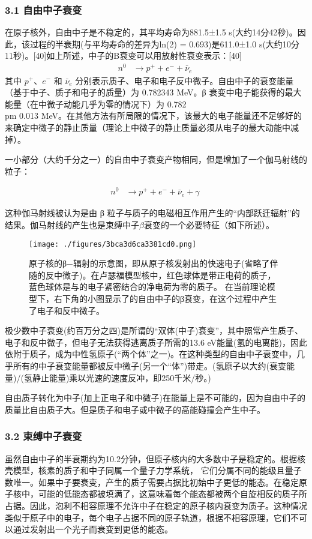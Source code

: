 \subsubsection{3.1 自由中子衰变}
在原子核外，自由中子是不稳定的，其平均寿命为881.5±1.5 s(大约14分42秒)。因此，该过程的半衰期(与平均寿命的差异为ln(2) = 0.693)是611.0±1.0 s(大约10分11秒)。[40]如上所述，中子的Β衰变可以用放射性衰变表示：[40]
\begin{align}
n^0 &\rightarrow p^+ + e^- + \bar{\nu}_e~
\end{align}
其中 $p^+$、$e^-$ 和 $\bar{\nu}_e$ 分别表示质子、电子和电子反中微子。自由中子的衰变能量（基于中子、质子和电子的质量）为 0.782343 MeV。β 衰变中电子能获得的最大能量（在中微子动能几乎为零的情况下）为 0.782 \\pm 0.013 MeV。在其他方法有所局限的情况下，该最大的电子能量还不足够好的来确定中微子的静止质量（理论上中微子的静止质量必须从电子的最大动能中减掉）。

一小部分（大约千分之一）的自由中子衰变产物相同，但是增加了一个伽马射线的粒子：

\begin{align}
n^0 &\rightarrow p^+ + e^- + \bar{\nu}_e + \gamma~
\end{align}

这种伽马射线被认为是由 β 粒子与质子的电磁相互作用产生的“内部跃迁辐射”的结果。伽马射线的产生也是束缚中子$\beta$衰变的一个必要特征（如下所述）。
\begin{figure}[ht]
\centering
\texttt{[image: ./figures/3bca3d6ca3381cd0.png]}
\caption{原子核的β−辐射的示意图，即从原子核发射出的快速电子(省略了伴随的反中微子)。在卢瑟福模型核中，红色球体是带正电荷的质子，蓝色球体是与的电子紧密结合的净电荷为零的质子。 在当前理论模型下，右下角的小图显示了的自由中子的β衰变，在这个过程中产生了电子和反中微子。} \label{fig_Neutro_4}
\end{figure}
极少数中子衰变(约百万分之四)是所谓的“双体(中子)衰变”，其中照常产生质子、电子和反中微子，但电子无法获得逃离质子所需的13.6 eV能量(氢的电离能)，因此依附于质子，成为中性氢原子(“两个体”之一)。在这种类型的自由中子衰变中，几乎所有的中子衰变能量都被反中微子(另一个“体”)带走。(氢原子以大约(衰变能量)/(氢静止能量)乘以光速的速度反冲，即250千米/秒。)

自由质子转化为中子(加上正电子和中微子)在能量上是不可能的，因为自由中子的质量比自由质子大。但是质子和电子或中微子的高能碰撞会产生中子。

\subsubsection{3.2 束缚中子衰变}
虽然自由中子的半衰期约为10.2分钟，但原子核内的大多数中子是稳定的。根据核壳模型，核素的质子和中子同属一个量子力学系统， 它们分属不同的能级且量子数唯一。如果中子要衰变，产生的质子需要占据比初始中子更低的能态。在稳定原子核中，可能的低能态都被填满了，这意味着每个能态都被两个自旋相反的质子所占据。因此，泡利不相容原理不允许中子在稳定的原子核内衰变为质子。这种情况类似于原子中的电子，每个电子占据不同的原子轨道，根据不相容原理，它们不可以通过发射出一个光子而衰变到更低的能态。

